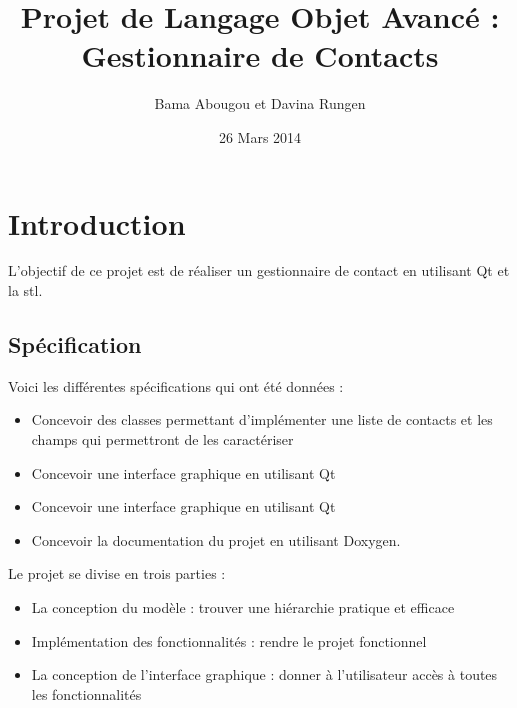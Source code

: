 \documentclass{report}
\title{Projet de Langage Objet Avancé : Gestionnaire de Contacts}
\author{Bama Abougou et Davina Rungen}
\date{26 Mars 2014}
\begin{document}
\maketitle

\tableofcontents

\chapter{Introduction}
L’objectif de ce projet est de réaliser un gestionnaire de contact en utilisant Qt
et la stl.
\section{Spécification}
Voici les différentes spécifications qui ont été données :
\begin{itemize}
\item Concevoir des classes permettant d’implémenter une liste de contacts et les
champs qui permettront de les caractériser
\item Concevoir une interface graphique en utilisant Qt
\item Concevoir une interface graphique en utilisant Qt
\item Concevoir la documentation du projet en utilisant Doxygen.
\end{itemize}
Le projet se divise en trois parties :
\begin{itemize}
\item La conception du modèle : trouver une hiérarchie pratique et efficace
\item Implémentation des fonctionnalités : rendre le projet fonctionnel
\item La conception de l’interface graphique : donner à l’utilisateur accès à toutes
les fonctionnalités
\end{itemize}
\end{document}
